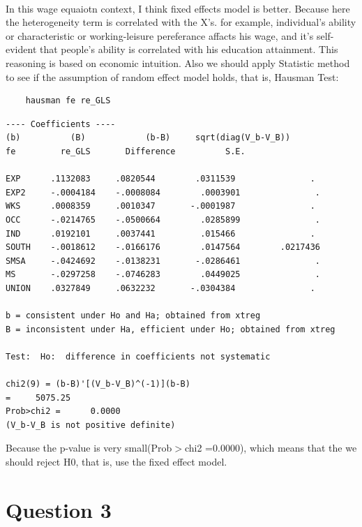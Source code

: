 \documentclass{article}
\begin{document}
\paragraph{} In this wage equaiotn context, I think fixed effects model is better. Because here the heterogeneity term is correlated with the X's. for example, individual's ability or characteristic or working-leisure pereferance affacts his wage, and it's self-evident that people's ability is correlated with his education attainment. This reasoning is based on economic intuition. Also we should apply Statistic method to see if the assumption of random effect model holds, that is, Hausman Test:
\begin{lstlisting}
    hausman fe re_GLS 
\end{lstlisting}

\begin{lstlisting}[basicstyle=\footnotesize\ttfamily]
---- Coefficients ----
(b)          (B)            (b-B)     sqrt(diag(V_b-V_B))
fe         re_GLS       Difference          S.E.

EXP	     .1132083     .0820544        .0311539               .
EXP2     -.0004184    -.0008084        .0003901               .
WKS	     .0008359     .0010347       -.0001987               .
OCC	     -.0214765    -.0500664        .0285899               .
IND      .0192101     .0037441         .015466               .
SOUTH    -.0018612    -.0166176        .0147564        .0217436
SMSA     -.0424692    -.0138231       -.0286461               .
MS	     -.0297258    -.0746283        .0449025               .
UNION    .0327849     .0632232       -.0304384               .

b = consistent under Ho and Ha; obtained from xtreg
B =	inconsistent under Ha, efficient under Ho; obtained from xtreg

Test:  Ho:	difference in coefficients not systematic

chi2(9) = (b-B)'[(V_b-V_B)^(-1)](b-B)
=     5075.25
Prob>chi2 =      0.0000
(V_b-V_B is not positive definite)
\end{lstlisting}
Because the p-value is very small(Prob$>$chi2 =0.0000), which means that the we should reject H0, that is, use the fixed effect model.


\section{Question 3}
\end{document}
